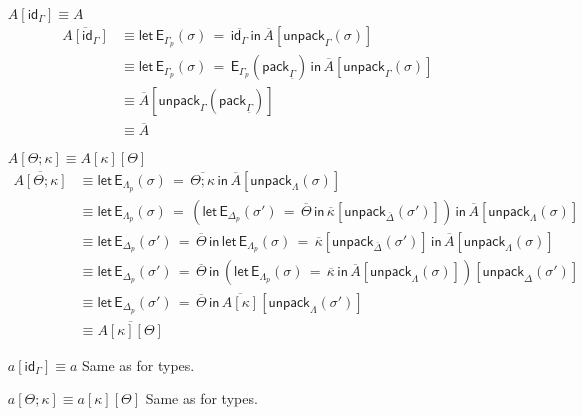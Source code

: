 \documentclass[10pt]{article}
\theoremstyle{definition}
\newcommand{\id}{\mathsf{id}}
\newcommand\EEs[4]{\ensuremath{\mathsf{let} \, \mathsf{E}_{#1}(#3) \, = \, {#2} \, \mathsf{in} \, #4}}
\newcommand\EIs[2]{\ensuremath{\mathsf{E}_{#1}{(#2)}}}
\newcommand\pack[1]{\ensuremath{\mathsf{pack}_{#1}}}
\newcommand\unpack[2]{\ensuremath{\mathsf{unpack}_{#1}(#2)}}
\newcommand{\modeof}[1]{{#1}_p}
\newcommand{\upstairs}[1]{\overline{#1}}
\newcommand{\downstairs}[1]{\underline{#1}}
\begin{document}
\begin{enumerate}[style = multiline, labelwidth = 80pt]
\item[{$A[\id_\Gamma] \equiv A$}] 
\begin{align*}
\upstairs{A[\id_\Gamma]}
&\equiv \EEs{\modeof{\Gamma}}{\upstairs{\id_\Gamma}}{\sigma}{\upstairs{A}[\unpack{\Gamma}{\sigma}]} \\
&\equiv \EEs{\modeof{\Gamma}}{\EIs{\modeof{\Gamma}}{\pack{\downstairs{\Gamma}}}}{\sigma}{\upstairs{A}[\unpack{\Gamma}{\sigma}]} \\
&\equiv \upstairs{A}[\unpack{\Gamma}{\pack{\downstairs{\Gamma}}}]\\
&\equiv \upstairs{A}
\end{align*}

\item[{$A[\Theta ; \kappa] \equiv A[\kappa][\Theta]$}] 
\begin{align*}
\upstairs{A[\Theta ; \kappa]}
&\equiv \EEs{\modeof{\Lambda}}{\upstairs{\Theta ; \kappa}}{\sigma}{\upstairs{A}[\unpack{\Lambda}{\sigma}]} \\
&\equiv \EEs{\modeof{\Lambda}}{(\EEs{\modeof{\Delta}}{\upstairs{\Theta}}{\sigma'}{\upstairs{\kappa}[\unpack{\upstairs{\Delta}}{\sigma'}]})}{\sigma}{\upstairs{A}[\unpack{\Lambda}{\sigma}]} \\
&\equiv \EEs{\modeof{\Delta}}{\upstairs{\Theta}}{\sigma'}{\EEs{\modeof{\Lambda}}{\upstairs{\kappa}[\unpack{\upstairs{\Delta}}{\sigma'}]}{\sigma}{\upstairs{A}[\unpack{\Lambda}{\sigma}]}} \\
&\equiv \EEs{\modeof{\Delta}}{\upstairs{\Theta}}{\sigma'}{(\EEs{\modeof{\Lambda}}{\upstairs{\kappa}}{\sigma}{\upstairs{A}[\unpack{\Lambda}{\sigma}]})[\unpack{\Delta}{\sigma'}]} \\
&\equiv \EEs{\modeof{\Delta}}{\upstairs{\Theta}}{\sigma'}{\upstairs{A[\kappa]}[\unpack{\Lambda}{\sigma'}]} \\
&\equiv \upstairs{A[\kappa][\Theta]}
\end{align*}

\item[{$a[\id_\Gamma] \equiv a$}] Same as for types.
\item[{$a[\Theta ; \kappa] \equiv a[\kappa][\Theta]$}] Same as for types.


\end{enumerate}
\end{document}
